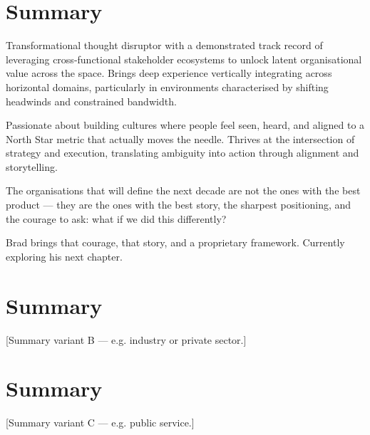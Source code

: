 
\ifsummaryA
\section*{Summary}
Transformational thought disruptor with a demonstrated track record of leveraging cross-functional stakeholder ecosystems to unlock latent organisational value across the space. Brings deep experience vertically integrating across horizontal domains, particularly in environments characterised by shifting headwinds and constrained bandwidth.

Passionate about building cultures where people feel seen, heard, and aligned to a North Star metric that actually moves the needle. Thrives at the intersection of strategy and execution, translating ambiguity into action through alignment and storytelling.

The organisations that will define the next decade are not the ones with the best product --- they are the ones with the best story, the sharpest positioning, and the courage to ask: what if we did this differently?

Brad brings that courage, that story, and a proprietary framework. Currently exploring his next chapter.
\fi

\ifsummaryB
\section*{Summary}
[Summary variant B — e.g. industry or private sector.]
\fi

\ifsummaryC
\section*{Summary}
[Summary variant C — e.g. public service.]
\fi
